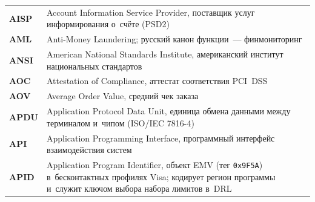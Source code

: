 \begin{longtable}{@{}p{4.5em}p{\dimexpr\linewidth-4.5em-2\tabcolsep\relax}@{}}
  \textbf{AISP}              & Account Information Service Provider, поставщик услуг информирования о~счёте (PSD2)                                                                                                                                                                                                              \\
  \textbf{AML}               & Anti-Money Laundering; русский канон функции~--- финмониторинг                                                                                                                                                                                                                                  \\
  \textbf{ANSI}              & American National Standards Institute, американский институт национальных стандартов                                                                                                                                                                                                             \\
  \textbf{AOC}               & Attestation of Compliance, аттестат соответствия PCI~DSS                                                                                                                                                                                                                                         \\
  \textbf{AOV}               & Average Order Value, средний чек заказа                                                                                                                                                                                                                                                          \\
  \textbf{APDU}              & Application Protocol Data Unit, единица обмена данными между терминалом и~чипом (ISO/IEC 7816-4)                                                                                                                                                                                                 \\
  \textbf{API}               & Application Programming Interface, программный интерфейс взаимодействия систем                                                                                                                                                                                                                   \\
  \textbf{APID}              & Application Program Identifier, объект EMV (тег \texttt{0x9F5A}) в~бесконтактных профилях Visa; кодирует регион программы и~служит ключом выбора набора лимитов в~DRL                                                                                                                            \\

\end{longtable}
